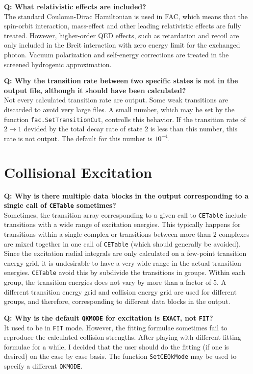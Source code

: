 \documentclass[twoside,letterpaper]{refrep}
\newcommand{\key}[1]{\texttt{#1}}
\newcounter{faq}[section]
\newcommand{\faq}[2]{\stepcounter{faq}
	\begin{minipage}{\textwidth}
	\textbf{Q\arabic{faq}: #1?}\\#2
	\end{minipage}}
\begin{document}
\faq{What relativistic effects are included}{
The standard Coulomn-Dirac Hamiltonian is used in FAC, which means that the
spin-orbit interaction, mass-effect and other leading relativistic effects are
fully treated. However, higher-order QED effects, such as retardation and
recoil are only included in the Breit interaction with zero energy limit for
the exchanged photon. Vacuum polarization and self-energy corrections are
treated in the screened hydrogenic approximation.}

\faq{Why the transition rate between two specific states is not in the output
file, although it should have been calculated}{
Not every calculated transition rate are output. Some weak transitions are
discarded to avoid very large files. A small number, which may be set by the
function \key{fac.SetTransitionCut}, controlls this behavior. If the
transition rate of $2\to 1$ devided by the total decay rate of state 2 is less
than this number, this rate is not output. The default for this number is
$10^{-4}$.}

\section{Collisional Excitation}
\faq{Why is there multiple data blocks in the output corresponding to a single
call of \key{CETable} sometimes}{
Sometimes, the transition array corresponding to a given call to \key{CETable}
include transitions with a wide range of excitation energies. This typically
happens for transitions within a single complex or transitions between more
than 2 complexes are mixed together in one call of \key{CETable} (which should
generally be avoided). Since the excitation radial integrals are only
calculated on a few-point transition energy grid, it is undesirable to have a
very wide range in the actual transition energies. \key{CETable} avoid this by
subdivide the transitions in groups. Within each group, the transition
energies does not vary by more than a factor of 5. A different transition
energy grid and collision energy grid are used for different groups, and
therefore, corresponding to different data blocks in the output.}

\faq{Why is the default \key{QKMODE} for excitation is \key{EXACT}, not
\key{FIT}}{
It used to be in \key{FIT} mode. However, the fitting formulae sometimes fail
to reproduce the calculated collision strengths. After playing with different
fitting formulae for a while, I decided that the user should do the fitting
(if one is desired) on the case by case basis. The function \key{SetCEQkMode}
may be used to specify a different \key{QKMODE}.}
\end{document}
